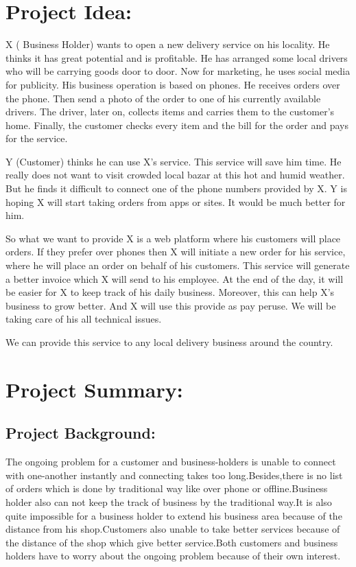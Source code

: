 \documentclass[13pt]{extarticle}
\begin{document}
\pagebreak

\tableofcontents

\newpage
\section{\textbf{Project Idea:} }

\quad X ( Business Holder) wants to open a new delivery service on his locality. He thinks it has great potential and is profitable. He has arranged some local drivers who will be carrying goods door to door. Now for marketing, he uses social media for publicity. His business operation is based on phones. He receives orders over the phone. Then send a photo of the order to one of his currently available drivers. The driver, later on, collects items and carries them to the customer’s home. Finally, the customer checks every item and the bill for the order and pays for the service. 

Y (Customer) thinks he can use X’s service. This service will save him time. He really does not want to visit crowded local bazar at this hot and humid weather. But he finds it difficult to connect one of the phone numbers provided by X. Y is hoping X will start taking orders from apps or sites. It would be much better for him. 

 So what we want to provide X is a web platform where his customers will place orders. If they prefer over phones then X will initiate a new order for his service, where he will place an order on behalf of his customers. This service will generate a better invoice which X will send to his employee. At the end of the day, it will be easier for X to keep track of his daily business. Moreover, this can help X’s business to grow better. And X will use this provide as pay peruse. We will be taking care of his all technical issues. 

We can provide this service to any local delivery business around the country.
\newpage
\section{\textbf{Project Summary:}}
\subsection{Project Background:}
\quad The ongoing problem for a customer and business-holders is unable to connect with one-another instantly and connecting takes too long.Besides,there is no list of orders which is done by traditional way like over phone or offline.Business holder also can not keep the track of business by the traditional way.It is also quite impossible for a business holder to extend his business area because of the distance from his shop.Customers also unable to take better services because of the distance of the shop which give better service.Both customers and business holders have to worry about the ongoing problem because of their own interest.
\end{document}
